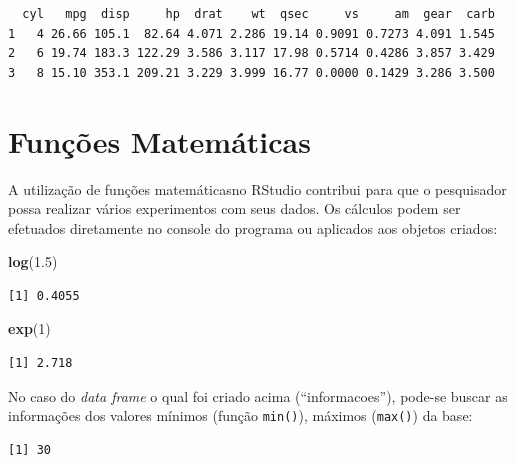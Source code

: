 \documentclass[12pt,brazil,oneside]{book}
\newenvironment{Shaded}{\begin{snugshade}}{\end{snugshade}}
\newcommand{\DecValTok}[1]{\textcolor[rgb]{0.00,0.00,0.81}{#1}}
\newcommand{\FloatTok}[1]{\textcolor[rgb]{0.00,0.00,0.81}{#1}}
\newcommand{\KeywordTok}[1]{\textcolor[rgb]{0.13,0.29,0.53}{\textbf{#1}}}
\newcommand{\NormalTok}[1]{#1}
\newcommand{\OperatorTok}[1]{\textcolor[rgb]{0.81,0.36,0.00}{\textbf{#1}}}
\begin{document}
\begin{verbatim}
  cyl   mpg  disp     hp  drat    wt  qsec     vs     am  gear  carb
1   4 26.66 105.1  82.64 4.071 2.286 19.14 0.9091 0.7273 4.091 1.545
2   6 19.74 183.3 122.29 3.586 3.117 17.98 0.5714 0.4286 3.857 3.429
3   8 15.10 353.1 209.21 3.229 3.999 16.77 0.0000 0.1429 3.286 3.500
\end{verbatim}

\hypertarget{funcoes-matematicas}{%
\section{Funções Matemáticas}\label{funcoes-matematicas}}

A utilização de funções matemáticasno RStudio contribui para que o pesquisador possa realizar vários experimentos com seus dados. Os cálculos podem ser efetuados diretamente no console do programa ou aplicados aos objetos criados:

\begin{Shaded}
\begin{Highlighting}[]
\KeywordTok{log}\NormalTok{(}\FloatTok{1.5}\NormalTok{)}
\end{Highlighting}
\end{Shaded}

\begin{verbatim}
[1] 0.4055
\end{verbatim}

\begin{Shaded}
\begin{Highlighting}[]
\KeywordTok{exp}\NormalTok{(}\DecValTok{1}\NormalTok{)}
\end{Highlighting}
\end{Shaded}

\begin{verbatim}
[1] 2.718
\end{verbatim}

No caso do \emph{data frame} o qual foi criado acima (``informacoes''), pode-se buscar as informações dos valores mínimos (função \texttt{min()}), máximos (\texttt{max()}) da base:

\begin{Shaded}
\end{Shaded}

\begin{verbatim}
[1] 30
\end{verbatim}
\end{document}
